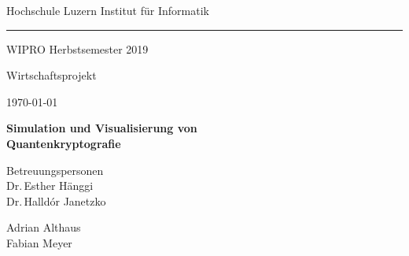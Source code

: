 \documentclass[a4paper,10.2pt,pdftex]{scrartcl}%
\begin{document}
\begin{titlepage} 
 \begin{center} 
    \thispagestyle{empty}
  {\small  Hochschule Luzern \hfill Institut für Informatik   \\[.75ex]
\hrule 
\vspace{0.75ex}
WIPRO  \hfill Herbstsemester 2019\\  

}


\vspace{14ex}



{\LARGE Wirtschaftsprojekt}


\vspace{2ex}

{\large \today}\\
\vspace{2ex}



\vspace{9ex}


{\huge\bfseries\textsf{Simulation und Visualisierung von \\[-1mm] Quantenkryptografie \\[5.5mm] }}



\vspace{5ex}

Betreuungspersonen \\[2mm] Dr.\,Esther Hänggi \\ Dr.\,Halldór Janetzko\\[3mm]


\vspace{8ex}

{\Large Adrian Althaus \\[2mm] Fabian Meyer  \Large {}}

\vspace{8ex}


 

\end{center}
\end{titlepage}

\vspace*{1ex}
\thispagestyle{plain}
\tableofcontents
\newpage
\end{document}
